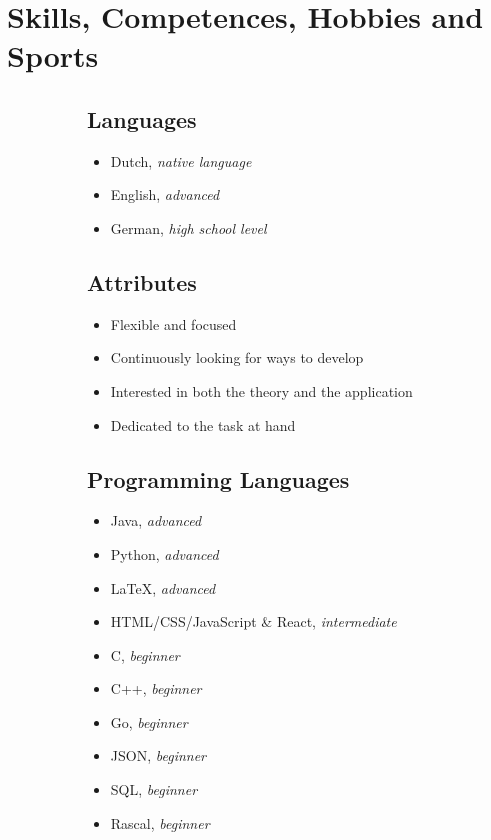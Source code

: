 \documentclass[11pt]{article}
\begin{document}
	\section*{Skills, Competences, Hobbies and Sports}
	\begin{figure}[h]
		\begin{subfigure}[t]{0.5\textwidth}
			\vskip 0pt
			\subsection*{Languages}
			\begin{itemize}[noitemsep]
				\item Dutch, \textit{native language}
				\item English, \textit{advanced}
				\item German, \textit{high school level}
			\end{itemize}
			\subsection*{Attributes}
			\begin{itemize}[noitemsep]
				\item Flexible and focused
				\item Continuously looking for ways to develop
				\item Interested in both the theory and the application
				\item Dedicated to the task at hand
			\end{itemize}	
		\end{subfigure}
		\begin{subfigure}[t]{0.5\textwidth}
			\vskip 0pt
			\subsection*{Programming Languages}
			\begin{itemize}[noitemsep]
				\item Java, \textit{advanced}
				\item Python, \textit{advanced}
				\item \LaTeX, \textit{advanced}
				\item HTML/CSS/JavaScript \& React, \textit{intermediate}
				\item C, \textit{beginner}
				\item C++, \textit{beginner}
				\item Go, \textit{beginner}
				\item JSON, \textit{beginner}
				\item SQL, \textit{beginner}
				\item Rascal, \textit{beginner}
			\end{itemize}
		\end{subfigure}
		\begin{subfigure}[t]{0.5\textwidth}
			\vskip 10pt

\end{subfigure}
\end{figure}
\end{document}
